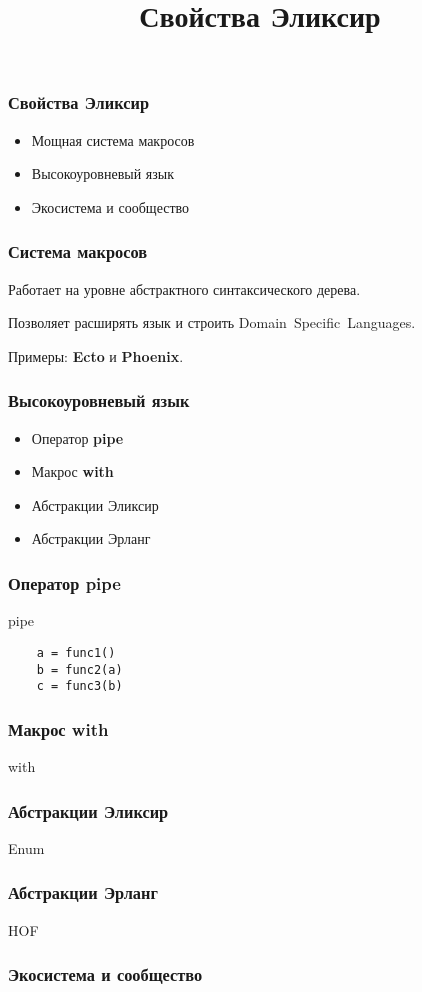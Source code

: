 \documentclass[10pt]{beamer}
\title{Свойства Эликсир}
\begin{document}
\begin{frame}
  \frametitle{Свойства Эликсир}
  \begin{itemize}
  \item Мощная система макросов
  \item Высокоуровневый язык
  \item Экосистема и сообщество
  \end{itemize}
\end{frame}

\begin{frame}
  \frametitle{Система макросов}
  Работает на уровне абстрактного синтаксического дерева.
  \par \bigskip
  Позволяет расширять язык и строить Domain~Specific~Languages.
  \par \bigskip
  Примеры: \textbf{Ecto} и \textbf{Phoenix}.
\end{frame}

\begin{frame}
  \frametitle{Высокоуровневый язык}
  \begin{itemize}
  \item Оператор \textbf{pipe}
  \item Макрос \textbf{with}
  \item Абстракции Эликсир
  \item Абстракции Эрланг
  \end{itemize}  
\end{frame}


\begin{frame}[fragile]
  \frametitle{Оператор pipe}
  pipe
  \begin{lstlisting}
    a = func1()
    b = func2(a)
    c = func3(b)
  \end{lstlisting}
\end{frame}

\begin{frame}
  \frametitle{Макрос with}
  with
\end{frame}

\begin{frame}
  \frametitle{Абстракции Эликсир}
  Enum
\end{frame}

\begin{frame}
  \frametitle{Абстракции Эрланг}
  HOF
\end{frame}

\begin{frame}
  \frametitle{Экосистема и сообщество}
\end{frame}
\end{document}
